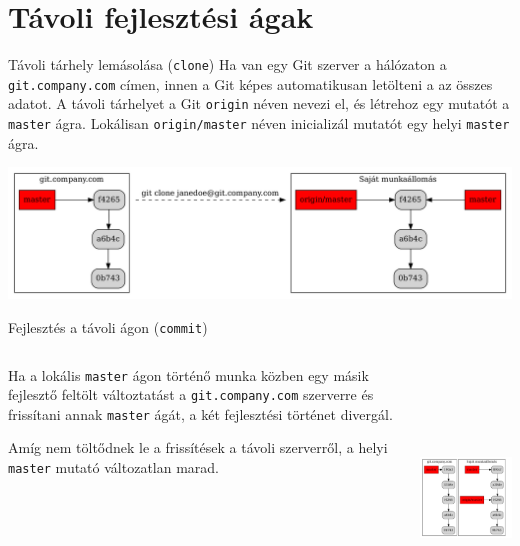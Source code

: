 \documentclass[english, aspectratio=169]{beamer}
\makeatletter
\let\origtableofcontents=\tableofcontents
\def\tableofcontents{\@ifnextchar[{\origtableofcontents}{\gobbletableofcontents}}
\def\gobbletableofcontents#1{\origtableofcontents}
\makeatother
\begin{document}
	\section{Távoli fejlesztési ágak}
	
	\begin{frame}
		\tableofcontents[currentsection]
	\end{frame}
	
	\begin{frame}{Távoli tárhely lemásolása (\texttt{clone})}
		Ha van egy Git szerver a hálózaton a \texttt{git.company.com} címen, innen a Git képes automatikusan letölteni a az összes adatot. A távoli tárhelyet a Git \texttt{origin} néven nevezi el, és létrehoz egy mutatót a \texttt{master} ágra. Lokálisan \texttt{origin/master} néven inicializál mutatót egy helyi \texttt{master} ágra.
		\begin{center}
			\includegraphics[width=14cm]{graphs/git_23.png}
		\end{center}
	\end{frame}
	
	\begin{frame}{Fejlesztés a távoli ágon (\texttt{commit})}
		\begin{columns}
			\begin{column}{.5\textwidth}
				Ha a lokális \texttt{master} ágon történő munka közben egy másik fejlesztő feltölt változtatást a \texttt{git.company.com} szerverre és frissítani annak \texttt{master} ágát, a két fejlesztési történet divergál.\par\smallskip
				Amíg nem töltődnek le a frissítések a távoli szerverről, a helyi \texttt{master} mutató változatlan marad.
			\end{column}
			\begin{column}{.5\textwidth}
				\begin{center}
					\includegraphics[width=7cm, height=7cm, keepaspectratio]{graphs/git_24.png}
				\end{center}
			\end{column}
		\end{columns}
	\end{frame}
	
\end{document}
